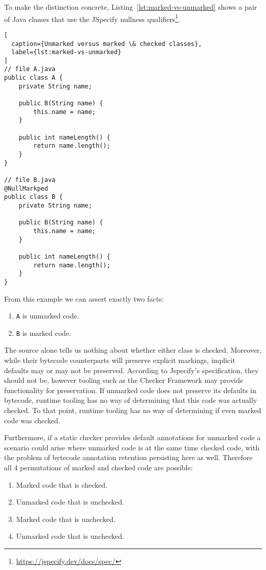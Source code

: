 \documentclass[12pt]{article}
\begin{document}
To make the distinction concrete, Listing~\ref{lst:marked-vs-unmarked} shows a pair of Java classes that use the JSpecify nullness qualifiers\footnote{\url{https://jspecify.dev/docs/spec/}}.

\begin{lstlisting}[
  caption={Unmarked versus marked \& checked classes},
  label={lst:marked-vs-unmarked}
]
// file A.java
public class A {
    private String name;

    public B(String name) {
        this.name = name;
    }

    public int nameLength() {
        return name.length();
    }
}

// file B.java
@NullMarkped
public class B {
    private String name;

    public B(String name) {
        this.name = name;
    }

    public int nameLength() {
        return name.length();
    }
}
\end{lstlisting}

From this example we can assert exactly two facts:
\begin{enumerate}
  \item \texttt{A} is unmarked code.
  \item \texttt{B} is marked code.
\end{enumerate}
The source alone tells us nothing about whether either class is checked. Moreover, while their bytecode counterparts will preserve explicit markings, implicit defaults may or may not be preserved. According to Jspecify's specification, they should not be, however tooling such as the Checker Framework may provide functionality for preservation. If unmarked code does not preserve its defaults in bytecode, runtime tooling has no way of determining that this code was actually checked. To that point, runtime tooling has no way of determining if even marked code was checked. 

Furthermore, if a static checker provides default annotations for unmarked code a scenario could arise where unmarked code is at the same time checked code, with the problem of bytecode annotation retention persisting here as well. Therefore all 4 permutations of marked and checked code are possible:
\begin{enumerate}
  \item Marked code that is checked.
  \item Unmarked code that is unchecked.
  \item Marked code that is unchecked.
  \item Unmarked code that is unchecked.
  \end{enumerate}
\end{document}
